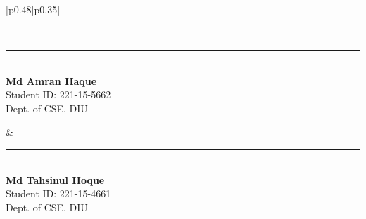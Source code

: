 \begin{table}[h!]
\centering
\renewcommand{\arraystretch}{3} %
\setlength{\tabcolsep}{10pt} %

\begin{tabular}{|p{0.48\textwidth}|p{0.35\textwidth}|} %

\hline
{} \\
\hline

\begin{minipage}{\linewidth}
    \centering
    \vspace{1.5cm} %
    \rule{6cm}{0.4pt} %
    \\
    \textbf{ Md Amran Haque} \\ Student ID: 221-15-5662
 \\ Dept. of CSE, DIU
\end{minipage} &

\begin{minipage}{\linewidth}
    \centering
    \vspace{1.5cm} %
    \rule{6cm}{0.4pt} %
    \\
    \textbf{Md Tahsinul Hoque} \\ Student ID:  221-15-4661 \\ Dept. of CSE, DIU
\end{minipage} \\
\hline

\end{tabular}

\end{table}
